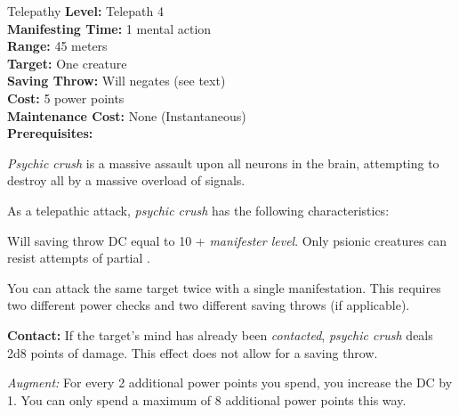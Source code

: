{Telepathy}
{
	\textbf{Level:}
	Telepath 4\\
	\textbf{Manifesting Time:}
	1 mental action\\
	\textbf{Range:}
	45 meters\\
	\textbf{Target:}
	One creature\\
	\textbf{Saving Throw:}
	Will negates (see text)\\
	\textbf{Cost:}
	5 power points\\
	\textbf{Maintenance Cost:}
	None (Instantaneous)\\
	\textbf{Prerequisites:}
	\\
}
{
	\emph{Psychic crush} is a massive assault upon all neurons in the brain, attempting to destroy all by a massive overload of signals.

	As a telepathic attack, \emph{psychic crush} has the following characteristics:
	\begin{itemize*}
		\item Will saving throw DC equal to 10 + \textit{manifester level}. Only psionic creatures can resist attempts of partial .
		\item You can attack the same target twice with a single manifestation. This requires two different power checks and two different saving throws (if applicable).
	\end{itemize*}

	\textbf{Contact:} If the target's mind has already been \emph{contacted}, \emph{psychic crush} deals 2d8 points of damage. This effect does not allow for a saving throw.

	\textit{Augment:} For every 2 additional power points you spend, you increase the DC by 1. You can only spend a maximum of 8 additional power points this way.
}
